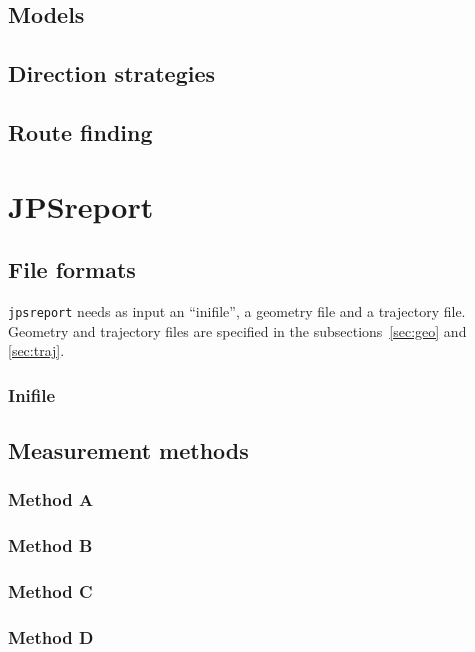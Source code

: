 \documentclass[%
paper=A4,					%
twoside=true,				%
openright,					%
parskip=full,				%
chapterprefix=true,			%
11pt,						%
headings=normal,			%
bibliography=totoc,			%
listof=totoc,				%
titlepage=on,				%
captions=tableabove,		%
draft=false,				%
]{scrreprt}%
\begin{document}
\section{Models}

\newpage
\section{Direction strategies}

\newpage
\section{Route finding}

\chapter{JPSreport}
\section{File formats}
\texttt{jpsreport} needs as input an ``inifile'', a geometry file and a trajectory file.
Geometry and trajectory files are specified in the subsections~\ref{sec:geo} and \ref{sec:traj}. 
\subsection{Inifile}

\newpage
\section{Measurement methods}
\subsection{Method A}

\newpage
\subsection{Method B}

\newpage
\subsection{Method C}

\newpage
\subsection{Method D}

\newpage
\end{document}
